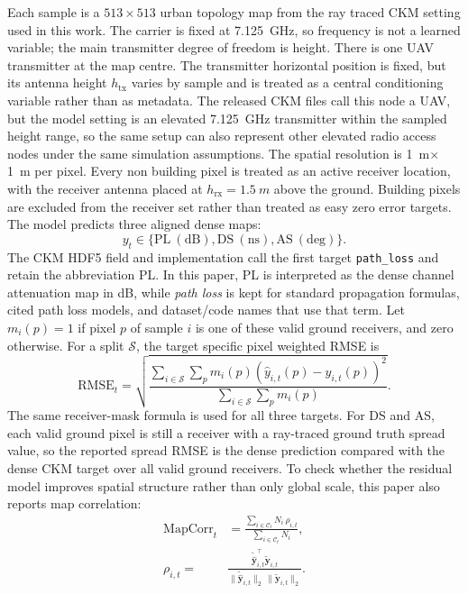 \documentclass[journal]{IEEEtran}
\begin{document}
Each sample is a \(513\times513\) urban topology map from the ray traced CKM
setting used in this work. The carrier is fixed at
\SI{7.125}{GHz}, so frequency is not a learned variable; the main transmitter
degree of freedom is height. There is one UAV transmitter at the map centre.
The transmitter horizontal position is fixed, but its antenna height
\(h_{\mathrm{tx}}\) varies by sample and is treated as a central conditioning
variable rather than as metadata. The released CKM files call this node a UAV,
but the model setting is an elevated \SI{7.125}{GHz} transmitter within the
sampled height range, so the same setup can also represent other elevated radio
access nodes under the same simulation assumptions. The spatial resolution is
\SI{1}{m}\(\times\)\SI{1}{m} per pixel. Every non building pixel is treated as
an active receiver location, with the receiver antenna placed at
\(h_{\mathrm{rx}}=\SI{1.5}{m}\) above the ground. Building pixels are excluded
from the receiver set rather than treated as easy zero error targets. The model
predicts three aligned dense maps:
\[
  y_t \in \{\mathrm{PL~(dB)}, \mathrm{DS~(ns)}, \mathrm{AS~(deg)}\}.
\]
The CKM HDF5 field and implementation call the first target \texttt{path\_loss}
and retain the abbreviation PL. In this paper, PL is interpreted as the dense
channel attenuation map in dB, while \emph{path loss} is kept for standard
propagation formulas, cited path loss models, and dataset/code names that use
that term.
Let \(m_i(p)=1\) if pixel \(p\) of sample \(i\) is one of these valid ground
receivers, and zero otherwise. For a split \(\mathcal{S}\), the
target specific pixel weighted RMSE is
\begin{equation}
  \mathrm{RMSE}_t =
  \sqrt{
  \frac{\sum_{i\in\mathcal{S}}\sum_p m_i(p)
  \left(\hat{y}_{i,t}(p)-y_{i,t}(p)\right)^2}
  {\sum_{i\in\mathcal{S}}\sum_p m_i(p)}}.
  \label{eq:rmse}
\end{equation}
The same receiver-mask formula is used for all three targets. For DS and AS,
each valid ground pixel is still a receiver with a ray-traced ground truth
spread value, so the reported spread RMSE is the dense prediction compared with
the dense CKM target over all valid ground receivers.
To check whether the residual model improves spatial structure rather than only
global scale, this paper also reports map correlation:
\[
\begin{aligned}
\mathrm{MapCorr}_t
&=
\frac{\sum_{i\in\mathcal{C}_t} N_i\,\rho_{i,t}}
{\sum_{i\in\mathcal{C}_t} N_i},\\
\rho_{i,t}=
&\frac{\tilde{\hat{\mathbf y}}_{i,t}^{\top}\tilde{\mathbf y}_{i,t}}
{\|\tilde{\hat{\mathbf y}}_{i,t}\|_2\,\|\tilde{\mathbf y}_{i,t}\|_2}.
\end{aligned}
\]
\end{document}
